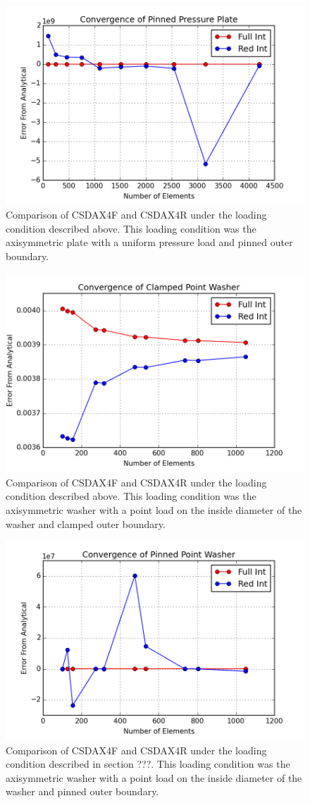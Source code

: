 \documentclass[10pt,letterpaper]{report}
\numberwithin{equation}{chapter}
\begin{document}
\begin{figure}[H]
\centering
\includegraphics[width=0.7\linewidth]{./GoodImages/Conv_PlPrPi_1}
\caption[H refinement of CSDAX4F]{Comparison of CSDAX4F and CSDAX4R under the loading condition described above. This loading condition was the axisymmetric plate with a uniform pressure load and pinned outer boundary.}
\label{fig:Conv_PlPoCl_1}
\end{figure}

\begin{figure}[H]
\centering
\includegraphics[width=0.7\linewidth]{./GoodImages/Conv_WaPoCl_1}
\caption[H refinement of CSDAX4F]{Comparison of CSDAX4F and CSDAX4R under the loading condition described above. This loading condition was the axisymmetric washer with a point load on the inside diameter of the washer and clamped outer boundary.}
\label{fig:Conv_PlPoCl_1}
\end{figure}

\begin{figure}[H]
\centering
\includegraphics[width=0.7\linewidth]{./GoodImages/Conv_WaPoPi_1}
\caption[H refinement of CSDAX4F]{Comparison of CSDAX4F and CSDAX4R under the loading condition described in section ???. This loading condition was the axisymmetric washer with a point load on the inside diameter of the washer and pinned outer boundary.}
\label{fig:Conv_PlPoCl_1}
\end{figure}
\end{document}
